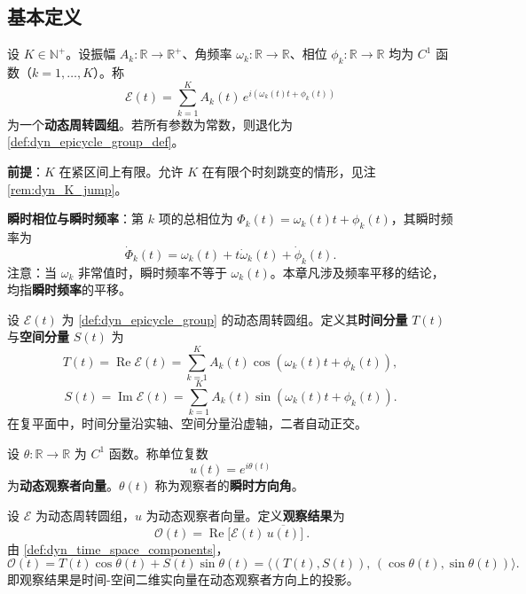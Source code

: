 \subsection{基本定义}

\begin{definition}[动态周转圆组]\label{def:dyn_epicycle_group}
设 $K\in\mathbb N^+$。设振幅 $A_k:\mathbb R\to\mathbb R^+$、角频率 $\omega_k:\mathbb R\to\mathbb R$、相位 $\phi_k:\mathbb R\to\mathbb R$ 均为 $C^1$ 函数（$k=1,\dots,K$）。称
\[
\mathcal E(t)=\sum_{k=1}^{K}A_k(t)\,e^{i(\omega_k(t)t+\phi_k(t))}
\]
为一个\textbf{动态周转圆组}。若所有参数为常数，则退化为 \cref{def:dyn_epicycle_group_def}。

\textbf{前提}：$K$ 在紧区间上有限。允许 $K$ 在有限个时刻跳变的情形，见注 \ref{rem:dyn_K_jump}。

\textbf{瞬时相位与瞬时频率}：第 $k$ 项的总相位为 $\Phi_k(t)=\omega_k(t)t+\phi_k(t)$，其瞬时频率为
\[
\dot\Phi_k(t)=\omega_k(t)+t\dot\omega_k(t)+\dot\phi_k(t).
\]
注意：当 $\omega_k$ 非常值时，瞬时频率不等于 $\omega_k(t)$。本章凡涉及频率平移的结论，均指\textbf{瞬时频率}的平移。
\end{definition}

\begin{definition}[时间分量与空间分量]\label{def:dyn_time_space_components}
设 $\mathcal E(t)$ 为 \cref{def:dyn_epicycle_group} 的动态周转圆组。定义其\textbf{时间分量} $T(t)$ 与\textbf{空间分量} $S(t)$ 为
\[
T(t)=\operatorname{Re}\mathcal E(t)=\sum_{k=1}^{K}A_k(t)\cos(\omega_k(t)t+\phi_k(t)),
\]
\[
S(t)=\operatorname{Im}\mathcal E(t)=\sum_{k=1}^{K}A_k(t)\sin(\omega_k(t)t+\phi_k(t)).
\]
在复平面中，时间分量沿实轴、空间分量沿虚轴，二者自动正交。
\end{definition}

\begin{definition}[动态观察者向量]\label{def:dyn_observer}
设 $\theta:\mathbb R\to\mathbb R$ 为 $C^1$ 函数。称单位复数
\[
u(t)=e^{i\theta(t)}
\]
为\textbf{动态观察者向量}。$\theta(t)$ 称为观察者的\textbf{瞬时方向角}。
\end{definition}

\begin{definition}[动态投影观察结果]\label{def:dyn_projection}
设 $\mathcal E$ 为动态周转圆组，$u$ 为动态观察者向量。定义\textbf{观察结果}为
\[
\boxed{\ \mathcal O(t)=\operatorname{Re}\!\big[\mathcal E(t)\,\overline{u(t)}\big]\ }.
\]
由 \cref{def:dyn_time_space_components}，
\[
\mathcal O(t)=T(t)\cos\theta(t)+S(t)\sin\theta(t)
=\big\langle (T(t),S(t)),\,(\cos\theta(t),\sin\theta(t))\big\rangle.
\]
即观察结果是时间-空间二维实向量在动态观察者方向上的投影。
\end{definition}

